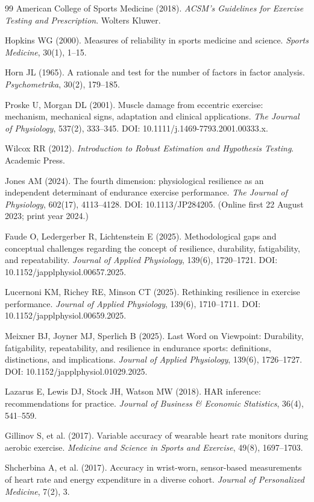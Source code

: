 \documentclass[times, twoside]{zHenriquesLab-StyleBioRxiv}
\begin{document}
\begin{thebibliography}{99}
American College of Sports Medicine (2018). \textit{ACSM's Guidelines for Exercise Testing and Prescription}. Wolters Kluwer.

Hopkins WG (2000). Measures of reliability in sports medicine and science. \textit{Sports Medicine}, 30(1), 1--15.

Horn JL (1965). A rationale and test for the number of factors in factor analysis. \textit{Psychometrika}, 30(2), 179--185.

Proske U, Morgan DL (2001). Muscle damage from eccentric exercise: mechanism, mechanical signs, adaptation and clinical applications. \textit{The Journal of Physiology}, 537(2), 333--345. DOI: 10.1111/j.1469-7793.2001.00333.x.

Wilcox RR (2012). \textit{Introduction to Robust Estimation and Hypothesis Testing}. Academic Press.

Jones AM (2024). The fourth dimension: physiological resilience as an independent determinant of endurance exercise performance. \textit{The Journal of Physiology}, 602(17), 4113--4128. DOI: 10.1113/JP284205. (Online first 22 August 2023; print year 2024.)

Faude O, Ledergerber R, Lichtenstein E (2025). Methodological gaps and conceptual challenges regarding the concept of resilience, durability, fatigability, and repeatability. \textit{Journal of Applied Physiology}, 139(6), 1720--1721. DOI: 10.1152/japplphysiol.00657.2025.

Lucernoni KM, Richey RE, Minson CT (2025). Rethinking resilience in exercise performance. \textit{Journal of Applied Physiology}, 139(6), 1710--1711. DOI: 10.1152/japplphysiol.00659.2025.

Meixner BJ, Joyner MJ, Sperlich B (2025). Last Word on Viewpoint: Durability, fatigability, repeatability, and resilience in endurance sports: definitions, distinctions, and implications. \textit{Journal of Applied Physiology}, 139(6), 1726--1727. DOI: 10.1152/japplphysiol.01029.2025.

Lazarus E, Lewis DJ, Stock JH, Watson MW (2018). HAR inference: recommendations for practice. \textit{Journal of Business \& Economic Statistics}, 36(4), 541--559.

Gillinov S, et al. (2017). Variable accuracy of wearable heart rate monitors during aerobic exercise. \textit{Medicine and Science in Sports and Exercise}, 49(8), 1697--1703.

Shcherbina A, et al. (2017). Accuracy in wrist-worn, sensor-based measurements of heart rate and energy expenditure in a diverse cohort. \textit{Journal of Personalized Medicine}, 7(2), 3.

\end{thebibliography}
\end{document}
